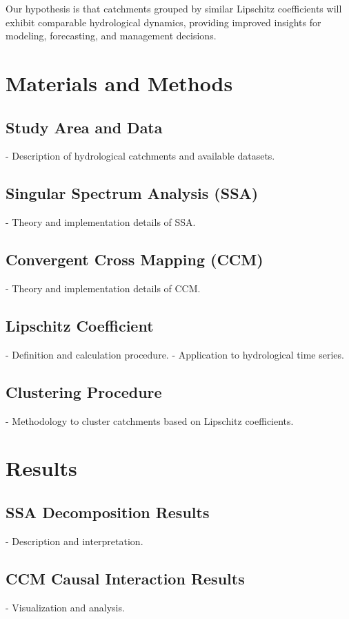 \documentclass[11pt,a4paper]{article}
\begin{document}
Our hypothesis is that catchments grouped by similar Lipschitz coefficients will exhibit comparable hydrological dynamics, providing improved insights for modeling, forecasting, and management decisions.

\section{Materials and Methods}

\subsection{Study Area and Data}
- Description of hydrological catchments and available datasets.

\subsection{Singular Spectrum Analysis (SSA)}
- Theory and implementation details of SSA.

\subsection{Convergent Cross Mapping (CCM)}
- Theory and implementation details of CCM.

\subsection{Lipschitz Coefficient}
- Definition and calculation procedure.
- Application to hydrological time series.

\subsection{Clustering Procedure}
- Methodology to cluster catchments based on Lipschitz coefficients.

\section{Results}
\subsection{SSA Decomposition Results}
- Description and interpretation.

\subsection{CCM Causal Interaction Results}
- Visualization and analysis.
\end{document}
